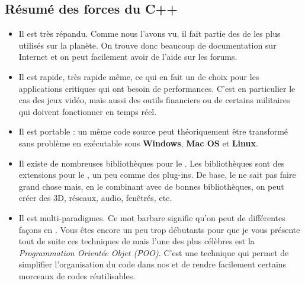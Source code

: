 \subsection{Résumé des forces du C++}
\begin{itemize}
	\item Il est très répandu. Comme nous l'avons vu, il fait partie des \langs de \progio les plus utilisés sur la planète. On trouve donc beaucoup de documentation sur Internet et on peut facilement avoir de l'aide sur les forums. 
	\item Il est rapide, très rapide même, ce qui en fait un \lang de choix pour les applications critiques qui ont besoin de performances. C'est en particulier le cas des jeux vidéo, mais aussi des outils financiers ou de certains \progs militaires qui doivent fonctionner en temps réel.
	\item Il est portable : un même code source peut théoriquement être transformé sans problème en exécutable sous \textbf{Windows}, \textbf{Mac OS} et \textbf{Linux}. 
	\item Il existe de nombreuses bibliothèques pour le \cplus. Les bibliothèques sont des extensions pour le \lang, un peu comme des plug-ins. De base, le \cplus ne sait pas faire grand chose mais, en le combinant avec de bonnes bibliothèques, on peut créer des \progs 3D, réseaux, audio, fenêtrés, etc.
	\item Il est multi-paradigmes. Ce mot barbare signifie qu'on peut \progrer de différentes façons en \cplus. Vous êtes encore un peu trop débutants pour que je vous présente tout de suite ces techniques de \progio mais l'une des plus célèbres est la \emph{Programmation Orientée Objet (POO)}. C'est une technique qui permet de simplifier l'organisation du code dans nos \progs et de rendre facilement certains morceaux de codes réutilisables. 
	
\end{itemize}